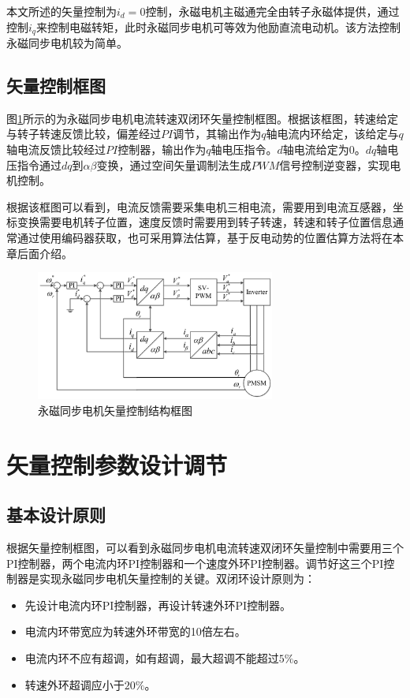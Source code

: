本文所述的矢量控制为$i_{d}=0$控制，永磁电机主磁通完全由转子永磁体提供，通过控制$i_{q}$来控制电磁转矩，此时永磁同步电机可等效为他励直流电动机。该方法控制永磁同步电机较为简单。
\subsection{矢量控制框图}
图\ref{fig:focStructure}所示的为永磁同步电机电流转速双闭环矢量控制框图。根据该框图，转速给定与转子转速反馈比较，偏差经过$PI$调节，其输出作为$q$轴电流内环给定，该给定与$q$轴电流反馈比较经过$PI$控制器，输出作为$q$轴电压指令。$d$轴电流给定为0。$dq$轴电压指令通过$dq$到$\alpha\beta$变换，通过空间矢量调制法生成$PWM$信号控制逆变器，实现电机控制。

根据该框图可以看到，电流反馈需要采集电机三相电流，需要用到电流互感器，坐标变换需要电机转子位置，速度反馈时需要用到转子转速，转速和转子位置信息通常通过使用编码器获取，也可采用算法估算，基于反电动势的位置估算方法将在本章后面介绍。
\begin{figure}[H]
	\centering
	\includegraphics[width=0.7\textwidth]{figs/focStructure.eps}
	\caption{永磁同步电机矢量控制结构框图}
	\label{fig:focStructure}
\end{figure}
\section{矢量控制参数设计调节}
\subsection{基本设计原则}
根据矢量控制框图，可以看到永磁同步电机电流转速双闭环矢量控制中需要用三个PI控制器，两个电流内环PI控制器和一个速度外环PI控制器。调节好这三个PI控制器是实现永磁同步电机矢量控制的关键。双闭环设计原则为：
\begin{itemize}
	\item 先设计电流内环PI控制器，再设计转速外环PI控制器。
	\item 电流内环带宽应为转速外环带宽的10倍左右。
	\item 电流内环不应有超调，如有超调，最大超调不能超过$5\%$。
	\item 转速外环超调应小于$20\%$。
\end{itemize}
